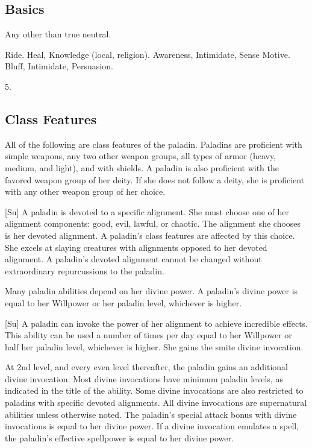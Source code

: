 \subsection{Basics}

 Any other than true neutral.

 Ride.
 Heal, Knowledge (local, religion).
 Awareness, Intimidate, Sense Motive.
 Bluff, Intimidate, Persuasion.

 5.

\subsection{Class Features}
All of the following are class features of the paladin.
 Paladins are proficient with simple weapons,  any two other weapon groups,  all types of armor (heavy, medium, and light), and with shields.
A paladin is also proficient with the favored weapon group of her deity.
If she does not follow a deity, she is proficient with any other weapon group of her choice.

[Su]
A paladin is devoted to a specific alignment.
She must choose one of her alignment components: good, evil, lawful, or chaotic.
The alignment she chooses is her devoted alignment.
A paladin's class features are affected by this choice.
She excels at slaying creatures with alignments opposed to her devoted alignment.
A paladin's devoted alignment cannot be changed without extraordinary repurcussions to the paladin.

Many paladin abilities depend on her divine power.
A paladin's divine power is equal to her Willpower or her paladin level, whichever is higher.

[Su]
A paladin can invoke the power of her alignment to achieve incredible effects.
This ability can be used a number of times per day equal to her Willpower or half her paladin level, whichever is higher.
She gains the smite divine invocation.

At 2nd level, and every even level thereafter, the paladin gains an additional divine invocation.
Most divine invocations have minimum paladin levels, as indicated in the title of the ability.
Some divine invocations are also restricted to paladins with specific devoted alignments.
All divine invocations are supernatural abilities unless otherwise noted.
The paladin's special attack bonus with divine invocations is equal to her divine power.
If a divine invocation emulates a spell, the paladin's effective spellpower is equal to her divine power.

